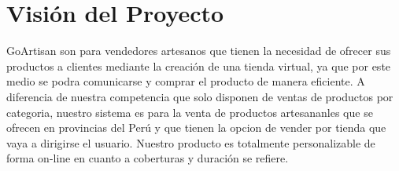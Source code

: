 \chapter{Visión del Proyecto}

GoArtisan son para vendedores artesanos que tienen la necesidad de ofrecer sus productos a clientes mediante la creación de una tienda virtual, ya que por este medio se podra comunicarse y comprar el producto de manera eficiente. A diferencia de nuestra competencia que solo disponen de ventas de productos por categoria, nuestro sistema es para la venta de productos artesananles que se ofrecen en provincias del Perú y que tienen la opcion de vender por tienda que vaya a dirigirse el usuario. Nuestro producto es totalmente personalizable de forma on-line en cuanto a coberturas y duración se refiere.